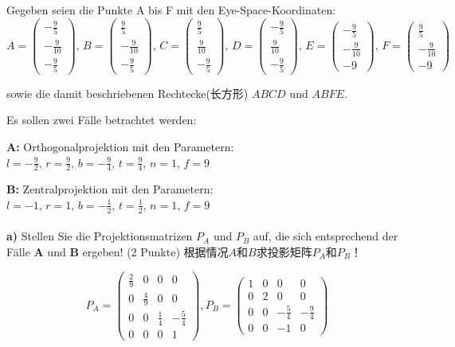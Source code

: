 \documentclass[fleqn]{article}
\begin{document}
Gegeben seien die Punkte A bis F mit den Eye-Space-Koordinaten:
$$A=\begin{pmatrix}
    -\frac{9}{5}\\-\frac{9}{10}\\-\frac{9}{5}
\end{pmatrix},\,B=\begin{pmatrix}
    \frac{9}{5}\\-\frac{9}{10}\\-\frac{9}{5}
\end{pmatrix},\,C=\begin{pmatrix}
    \frac{9}{5}\\\frac{9}{10}\\-\frac{9}{5}
\end{pmatrix},\,D=\begin{pmatrix}
    -\frac{9}{5}\\\frac{9}{10}\\-\frac{9}{5}
\end{pmatrix},\,E=\begin{pmatrix}
    -\frac{9}{5}\\-\frac{9}{10}\\-9
\end{pmatrix},\,F=\begin{pmatrix}
    \frac{9}{5}\\-\frac{9}{10}\\-9
\end{pmatrix} $$

sowie die damit beschriebenen Rechtecke(长方形) $ABCD$ und $ABFE$.

Es sollen zwei Fälle betrachtet werden:

\textbf{A:} Orthogonalprojektion mit den Parametern: $l= -\frac{9}{2},\,r= \frac{9}{2},\,b= -\frac{9}{4},\,t= \frac{9}{4},\,n=1,\,f=9$

\textbf{B:} Zentralprojektion mit den Parametern: $l=-1,\,r=1,\,b=-\frac{1}{2},\,t=\frac{1}{2},\,n=1,\,f=9$
\\
\\
\indent\textbf{a)} Stellen Sie die Projektionsmatrizen $P_A$ und $P_B$ auf, die sich entsprechend der Fälle \textbf{A} und \textbf{B} ergeben! (2 Punkte)
根据情况$A$和$B$求投影矩阵$P_A$和$P_B$！

$$
P_A = 
\begin{pmatrix}
    \frac{2}{9} & 0 & 0 & 0 \\
    0 & \frac{4}{9} & 0 & 0 \\
    0 & 0 & \frac{1}{4} & -\frac{5}{4} \\
    0 & 0 & 0 & 1
\end{pmatrix}, 
P_B =
\begin{pmatrix}
    1 & 0 & 0 & 0 \\
    0 & 2 & 0 & 0 \\
    0 & 0 & -\frac{5}{4} & -\frac{9}{4} \\ 
    0 & 0 & -1 & 0
\end{pmatrix}
$$
\end{document}
